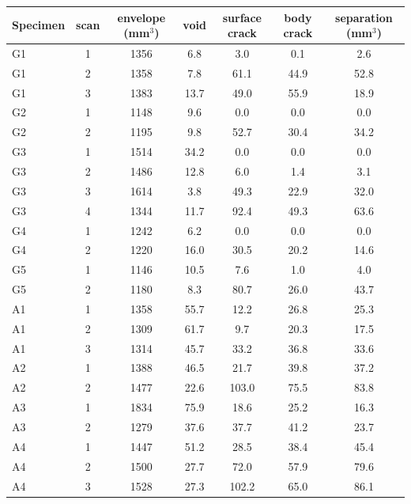 \begin{tabular}{lcccccc}
\toprule
Specimen & scan & envelope (mm$^3$) & void & surface crack & body crack & separation (mm$^3$) \\
\midrule
G1 & 1 & 1356 & 6.8 & 3.0 & 0.1 & 2.6 \\
G1 & 2 & 1358 & 7.8 & 61.1 & 44.9 & 52.8 \\
G1 & 3 & 1383 & 13.7 & 49.0 & 55.9 & 18.9 \\
G2 & 1 & 1148 & 9.6 & 0.0 & 0.0 & 0.0 \\
G2 & 2 & 1195 & 9.8 & 52.7 & 30.4 & 34.2 \\
G3 & 1 & 1514 & 34.2 & 0.0 & 0.0 & 0.0 \\
G3 & 2 & 1486 & 12.8 & 6.0 & 1.4 & 3.1 \\
G3 & 3 & 1614 & 3.8 & 49.3 & 22.9 & 32.0 \\
G3 & 4 & 1344 & 11.7 & 92.4 & 49.3 & 63.6 \\
G4 & 1 & 1242 & 6.2 & 0.0 & 0.0 & 0.0 \\
G4 & 2 & 1220 & 16.0 & 30.5 & 20.2 & 14.6 \\
G5 & 1 & 1146 & 10.5 & 7.6 & 1.0 & 4.0 \\
G5 & 2 & 1180 & 8.3 & 80.7 & 26.0 & 43.7 \\
A1 & 1 & 1358 & 55.7 & 12.2 & 26.8 & 25.3 \\
A1 & 2 & 1309 & 61.7 & 9.7 & 20.3 & 17.5 \\
A1 & 3 & 1314 & 45.7 & 33.2 & 36.8 & 33.6 \\
A2 & 1 & 1388 & 46.5 & 21.7 & 39.8 & 37.2 \\
A2 & 2 & 1477 & 22.6 & 103.0 & 75.5 & 83.8 \\
A3 & 1 & 1834 & 75.9 & 18.6 & 25.2 & 16.3 \\
A3 & 2 & 1279 & 37.6 & 37.7 & 41.2 & 23.7 \\
A4 & 1 & 1447 & 51.2 & 28.5 & 38.4 & 45.4 \\
A4 & 2 & 1500 & 27.7 & 72.0 & 57.9 & 79.6 \\
A4 & 3 & 1528 & 27.3 & 102.2 & 65.0 & 86.1 \\
\bottomrule
\end{tabular}
